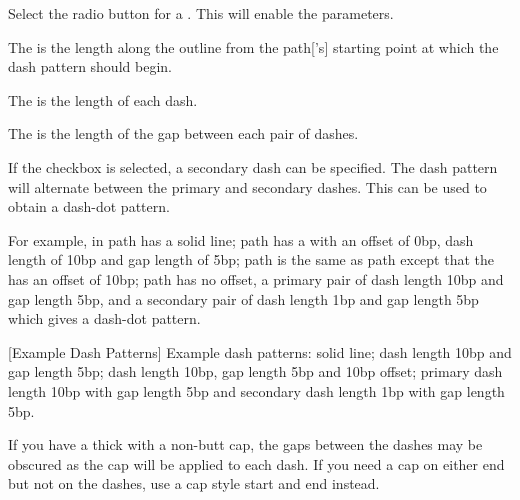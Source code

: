 
Select the  radio button for a
. This will enable the 
parameters.


The  is the length along the outline from the
\gls{path}['s] starting point at which the dash pattern should begin.


The  is the length of each dash.


The  is the length of the gap between
each pair of dashes.


If the  checkbox is selected, 
a secondary dash can be specified. The dash pattern will alternate
between the primary and secondary dashes. This can be used to obtain
a dash-dot pattern.

For example, in  path  has a
solid line; path  has a  with
an offset of 0\gls{bp}, dash length of 10\gls{bp} and gap length of
5\gls{bp}; path  is the same as path
 except that the  has an
offset of 10\gls{bp}; path  has no offset, a primary
pair of dash length 10\gls{bp} and gap length 5\gls{bp}, and a
secondary pair of dash length 1\gls{bp} and gap length 5\gls{bp}
which gives a dash-dot pattern.

{}
[Example Dash Patterns]
{Example dash patterns: 
solid line;  dash length 10bp and gap length 5bp;
 dash length 10bp, gap length 5bp and 10bp offset;
 primary dash length 10bp with gap length 5bp and
secondary dash length 1bp with gap length 5bp.}

\begin{information}
If you have a thick  with a non-butt cap, the
gaps between the dashes may be obscured as the cap will be applied
to each dash. If you need a cap on either end but not on the dashes,
use a cap style start and end  instead.
\end{information}



